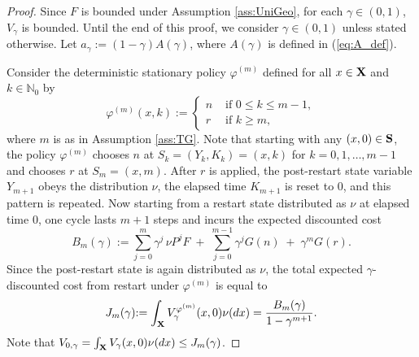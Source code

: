 \documentclass[letterpaper,10pt,conference]{ieeeconf}  %
\begin{document}
\begin{proof}
Since $F$ is bounded under Assumption \ref{ass:UniGeo}, for each $\gamma\in(0,1)$, $V_\gamma$ is bounded. Until the end of this proof, we consider $\gamma\in(0,1)$ unless stated otherwise.
Let $a_\gamma:=(1-\gamma){A(\gamma)}$, where ${A(\gamma)}$ is defined in (\ref{eq:A_def}).

Consider the {deterministic} stationary policy ${\varphi}^{(m)}$ {defined for all $x\in {\bf X}$ and $k\in\mathbb{N}_0$ by $$\varphi^{(m)}(x,k):=\begin{cases}
n &\mbox{ if $0\le k\le m-1$},\\
r &\mbox{ if $k\ge m$,}
\end{cases}$$
where $m$ is as in Assumption \ref{ass:TG}.}
{Note that starting with any $(x,0)\in {\bf S}$, the policy $\varphi^{(m)}$} chooses $n$ at {$S_k=(Y_k,K_k)=(x,k)$} for $k=0,1,\dots,m-1$
and chooses $r$ at {$S_m=(x,m)$.  After $r$ is applied, the post-restart state variable $Y_{m+1}$ obeys the distribution $\nu$, the elapsed time $K_{m+1}$ is reset to $0$, and this pattern is repeated.} 
Now starting from a restart state distributed as $\nu$ at elapsed time $0$, 
one cycle lasts $m+1$ steps and incurs the expected discounted cost
\[
B_m(\gamma):=\sum_{j=0}^{m}\gamma^j\,\nu P^jF\;+\;\sum_{j=0}^{m-1}\gamma^j G(n)\;+\;\gamma^m G(r).
\]
Since the post-restart state is again distributed as $\nu$, the total expected {$\gamma$-discounted} cost from restart 
under ${\varphi}^{(m)}$ is equal to
\begin{equation}\label{eq:Jm_def}
J_m(\gamma){:= \int_{\bf X}  V_\gamma^{\varphi^{(m)}}(x,0)\nu(dx)} =\frac{B_m(\gamma)}{1-\gamma^{m+1}}.
\end{equation}
 {Note that  $V_{0,\gamma}=\int_{\bf X}  V_\gamma (x,0)\nu(dx) \le J_m(\gamma)$.}


\end{proof}
\end{document}
